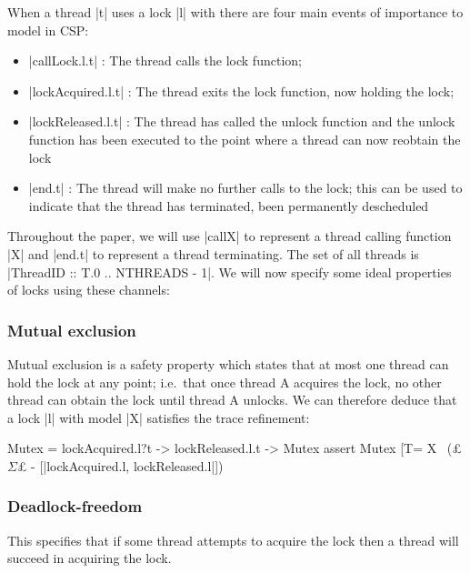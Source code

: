 When a thread |t| uses a lock |l| with there are four main events of importance to model in CSP:

\begin{itemize}
  \item |callLock.l.t| : The thread calls the lock function;
  \item |lockAcquired.l.t| : The thread exits the lock function, now holding the lock;
  \item |lockReleased.l.t| : The thread has called the unlock function and the unlock function has been executed to the point where a thread can now reobtain the lock
  \item |end.t| : The thread will make no further calls to the lock; this can be used to indicate that the thread has terminated, been permanently descheduled
\end{itemize}

Throughout the paper, we will use |callX| to represent a thread calling function |X| and |end.t| to represent a thread terminating. The set of all threads is |ThreadID :: T.{0 .. NTHREADS - 1}|. We will now specify some ideal properties of locks using these channels:

\subsubsection{Mutual exclusion}\label{mutual-exclusion}
Mutual exclusion is a safety property which states that at most one thread can hold the lock at any point; i.e.~that once thread A acquires the lock, no other thread can obtain the lock until thread A unlocks. We can therefore deduce that a lock |l| with model |X| satisfies the trace refinement:  

  
  \begin{cspm}
    Mutex = lockAcquired.l?t -> lockReleased.l.t -> Mutex
    assert Mutex [T= X \ (£$\Sigma$£ - [|lockAcquired.l, lockReleased.l|])
  \end{cspm}

\subsubsection{Deadlock-freedom}\label{deadlock-freedom}
This specifies that if some thread attempts to acquire the lock then a thread will succeed in acquiring the lock\cite{TAoMP}. 

